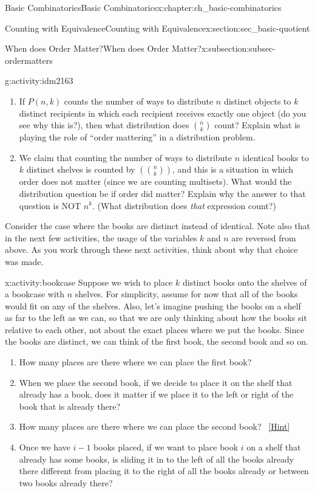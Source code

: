 \documentclass[oneside,10pt,]{book}
\numberwithin{equation}{chapter}
\newcommand{\mchoose}[2]{\left(\!\binom{#1}{#2}\!\right)}
\begin{document}
\begin{chapterptx}{Basic Combinatorics}{}{Basic Combinatorics}{}{}{x:chapter:ch_basic-combinatorics}
\begin{sectionptx}{Counting with Equivalence}{}{Counting with Equivalence}{}{}{x:section:sec_basic-quotient}
\begin{subsectionptx}{When does Order Matter?}{}{When does Order Matter?}{}{}{x:subsection:subsec-ordermatters}
\begin{activity}{}{g:activity:idm2163}
\begin{enumerate}[font=\bfseries,label=(\alph*),ref=\alph*]
\item{}If \(P(n,k)\) counts the number of ways to distribute \(n\) distinct objects to \(k\) distinct recipients in which each recipient receives exactly one object (do you see why this is?), then what distribution does \(\binom{n}{k}\) count?  Explain what is playing the role of ``order mattering'' in a distribution problem.%
\item{}We claim that counting the number of ways to distribute \(n\) identical books to \(k\) distinct shelves is counted by \(\mchoose{n}{k}\), and this is a situation in which order does not matter (since we are counting multisets).  What would the distribution question be if order did matter?  Explain why the answer to that question is NOT \(n^k\). (What distribution does \emph{that} expression count?)%
\end{enumerate}
\end{activity}
Consider the case where the books are distinct instead of identical.  Note also that in the next few activities, the usage of the variables \(k\) and \(n\) are reversed from above.  As you work through these next activities, think about why that choice was made.%
\begin{activity}{}{x:activity:bookcase}%
Suppose we wish to place \(k\) distinct books onto the shelves of a bookcase with \(n\) shelves. For simplicity, assume for now that all of the books would fit on any of the shelves. Also, let's imagine pushing the books on a shelf as far to the left as we can, so that we are only thinking about how the books sit relative to each other, not about the exact places where we put the books. Since the books are distinct, we can think of the first book, the second book and so on.%
\begin{enumerate}[font=\bfseries,label=(\alph*),ref=\alph*]
\item{}How many places are there where we can place the first book?%
\item{}When we place the second book, if we decide to place it on the shelf that already has a book, does it matter if we place it to the left or right of the book that is already there?%
\item{}How many places are there where we can place the second book?%
\qquad~\hfill{\tiny\hyperlink{g:hint:idm2202-back}{[Hint]}}\item{}Once we have \(i-1\) books placed, if we want to place book \(i\)  on a shelf that already has some books, is sliding it in to the left of all the books already there different from placing it to the right of all the books already or between two books already there?%

\end{enumerate}
\end{activity}
\end{subsectionptx}
\end{sectionptx}
\end{chapterptx}
\end{document}
